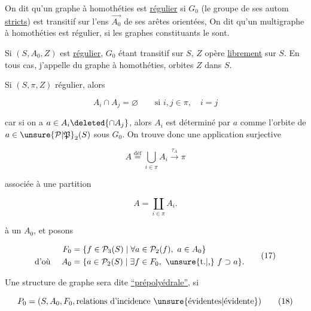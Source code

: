 
On dit qu'un graphe à homothéties est \uline{régulier} si $G_0$ (le groupe de ses autom \uline{stricts}) est transitif sur l'ens $\overrightarrow{A_0}$ de ses arêtes orientées,  On dit qu'un multigraphe  à homothéties est régulier, si les graphes constituants le sont.

Si  $(S,A_0,Z)$ est  \uline{régulier}, $G_0$ étant transitif sur $S$, $Z$ opère \uline{librement} sur $S$. En tous cas, j'appelle \uline{} du graphe à homothéties,  orbites   $Z$ dans $S$.

Si  \deleted{\unsure{$($}} $(S,\pi,Z)$  régulier, alors 

\[ A_i\cap A_j=\varnothing\qquad\text{si }i,j\in\pi,\quad i=j \tag*{(14)} \]

car si on a $a\in A_i\deleted{\cap A_j}$, alors $A_i$ est déterminé par $a$ comme l'orbite de $a\in\unsure{\mathcal P|\mathfrak P}_2(S)$ sous $G_0$. On trouve donc une application surjective


\[ A\overset{\mathrm{déf}}{=}\bigcup_{i\in\pi} A_i\xrightarrow{\tau_A}\pi \tag*{(15)} \]

associée à une partition

\[ A=\coprod_{i\in\pi} A_i. \tag*{(16)} \]

  à un $A_0$, et posons

\[
\begin{aligned}
 F_0&=\{f\in\mathcal P_3(S)\mid\forall a\in\mathcal P_2(f),\ a\in A_0\}\\
 \text{d'où }\quad A_0&=\{a\in\mathcal P_2(S)\mid\exists f\in F_0,\ \text{\unsure{t.|,}}~ f\supset a\}.
\end{aligned}\tag*{(17)}
\]

Une structure de graphe sera dite   \uline{``prépolyédrale''}, si

\[ P_0=(S,A_0,F_0,\text{relations d'incidence \unsure{évidentes|évidente}}) \tag*{(18)} \]


